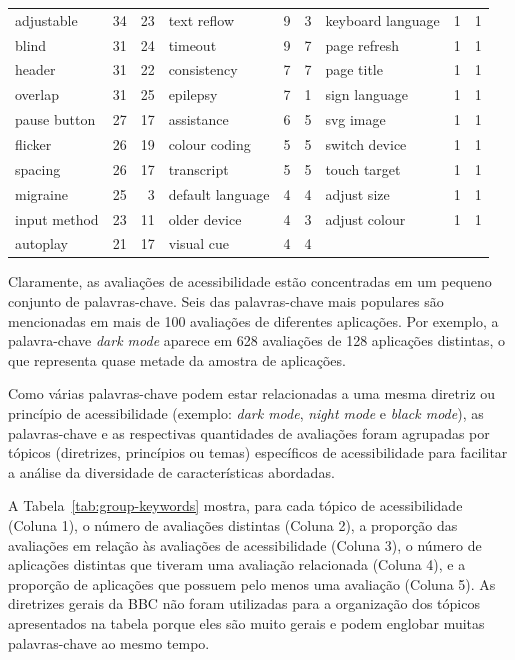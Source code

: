 \begin{table}[!htb]
\begin{tabular}{lrr||lrr||lrr}
adjustable       & 34      & 23   & text reflow      & 9       & 3    & keyboard language  & 1       & 1    \\
blind            & 31      & 24   & timeout          & 9       & 7    & page refresh       & 1       & 1    \\
header           & 31      & 22   & consistency      & 7       & 7    & page title         & 1       & 1    \\
overlap          & 31      & 25   & epilepsy         & 7       & 1    & sign language      & 1       & 1    \\
pause button     & 27      & 17   & assistance       & 6       & 5    & svg image          & 1       & 1    \\
flicker          & 26      & 19   & colour coding    & 5       & 5    & switch device      & 1       & 1    \\
spacing          & 26      & 17   & transcript       & 5       & 5    & touch target       & 1       & 1    \\
migraine         & 25      & 3    & default language & 4       & 4    & adjust size        & 1       & 1    \\
input method     & 23      & 11   & older device     & 4       & 3    & adjust colour      & 1       & 1    \\
autoplay         & 21      & 17   & visual cue       & 4       & 4    &                    &         &     \\
\hline
\end{tabular}
\end{table}

Claramente, as avaliações de acessibilidade estão concentradas em um pequeno conjunto de palavras-chave. Seis das palavras-chave mais populares são mencionadas em mais de 100 avaliações de diferentes aplicações. Por exemplo, a palavra-chave \textit{dark mode} aparece em 628 avaliações de 128 aplicações distintas, o que representa quase metade da amostra de aplicações.

Como várias palavras-chave podem estar relacionadas a uma mesma diretriz ou princípio de acessibilidade (exemplo: \textit{dark mode}, \textit{night mode} e \textit{black mode}), 
as palavras-chave e as respectivas quantidades de avaliações foram agrupadas por tópicos (diretrizes, princípios ou temas) específicos de acessibilidade para facilitar a análise da diversidade de características abordadas.

A Tabela~\ref{tab:group-keywords} mostra, para cada tópico de acessibilidade (Coluna 1), o número de avaliações distintas (Coluna 2), a proporção das avaliações em relação às avaliações de acessibilidade (Coluna 3), o número de aplicações distintas que tiveram uma avaliação relacionada (Coluna 4), e a proporção de aplicações que possuem pelo menos uma avaliação (Coluna 5).
As diretrizes gerais da BBC não foram utilizadas para a organização dos tópicos apresentados na tabela porque eles são muito gerais e podem englobar muitas palavras-chave ao mesmo tempo.

